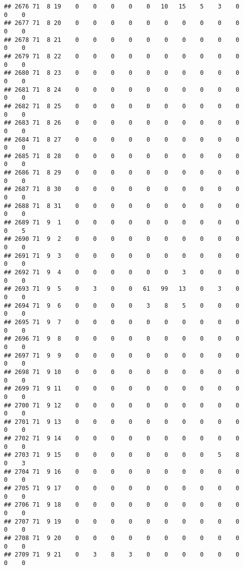 \documentclass[]{article}
\begin{document}
\begin{verbatim}
## 2676 71  8 19    0    0    0    0    0   10   15    5    3    0    0    0
## 2677 71  8 20    0    0    0    0    0    0    0    0    0    0    0    0
## 2678 71  8 21    0    0    0    0    0    0    0    0    0    0    0    0
## 2679 71  8 22    0    0    0    0    0    0    0    0    0    0    0    0
## 2680 71  8 23    0    0    0    0    0    0    0    0    0    0    0    0
## 2681 71  8 24    0    0    0    0    0    0    0    0    0    0    0    0
## 2682 71  8 25    0    0    0    0    0    0    0    0    0    0    0    0
## 2683 71  8 26    0    0    0    0    0    0    0    0    0    0    0    0
## 2684 71  8 27    0    0    0    0    0    0    0    0    0    0    0    0
## 2685 71  8 28    0    0    0    0    0    0    0    0    0    0    0    0
## 2686 71  8 29    0    0    0    0    0    0    0    0    0    0    0    0
## 2687 71  8 30    0    0    0    0    0    0    0    0    0    0    0    0
## 2688 71  8 31    0    0    0    0    0    0    0    0    0    0    0    0
## 2689 71  9  1    0    0    0    0    0    0    0    0    0    0    0    5
## 2690 71  9  2    0    0    0    0    0    0    0    0    0    0    0    0
## 2691 71  9  3    0    0    0    0    0    0    0    0    0    0    0    0
## 2692 71  9  4    0    0    0    0    0    0    3    0    0    0    0    0
## 2693 71  9  5    0    3    0    0   61   99   13    0    3    0    0    0
## 2694 71  9  6    0    0    0    0    3    8    5    0    0    0    0    0
## 2695 71  9  7    0    0    0    0    0    0    0    0    0    0    0    0
## 2696 71  9  8    0    0    0    0    0    0    0    0    0    0    0    0
## 2697 71  9  9    0    0    0    0    0    0    0    0    0    0    0    0
## 2698 71  9 10    0    0    0    0    0    0    0    0    0    0    0    0
## 2699 71  9 11    0    0    0    0    0    0    0    0    0    0    0    0
## 2700 71  9 12    0    0    0    0    0    0    0    0    0    0    0    0
## 2701 71  9 13    0    0    0    0    0    0    0    0    0    0    0    0
## 2702 71  9 14    0    0    0    0    0    0    0    0    0    0    0    0
## 2703 71  9 15    0    0    0    0    0    0    0    0    5    8    0    3
## 2704 71  9 16    0    0    0    0    0    0    0    0    0    0    0    0
## 2705 71  9 17    0    0    0    0    0    0    0    0    0    0    0    0
## 2706 71  9 18    0    0    0    0    0    0    0    0    0    0    0    0
## 2707 71  9 19    0    0    0    0    0    0    0    0    0    0    0    0
## 2708 71  9 20    0    0    0    0    0    0    0    0    0    0    0    0
## 2709 71  9 21    0    3    8    3    0    0    0    0    0    0    0    0

\end{verbatim}
\end{document}
